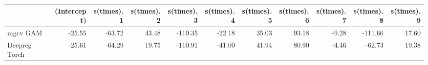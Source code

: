 
\begin{tabular}{l|r|r|r|r|r|r|r|r|r|r}
\hline
  & (Intercept) & s(times).1 & s(times).2 & s(times).3 & s(times).4 & s(times).5 & s(times).6 & s(times).7 & s(times).8 & s(times).9\\
\hline
mgcv GAM & -25.55 & -63.72 & 43.48 & -110.35 & -22.18 & 35.03 & 93.18 & -9.28 & -111.66 & 17.60\\
\hline
Deepreg Torch & -25.61 & -64.29 & 19.75 & -110.91 & -41.00 & 41.94 & 80.90 & -4.46 & -62.73 & 19.38\\
\hline
\end{tabular}
